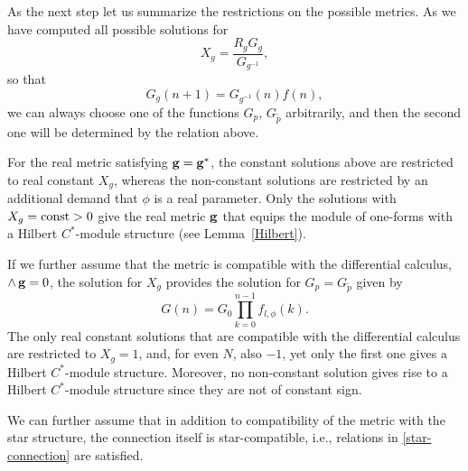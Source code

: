 \documentclass[10pt,a4paper]{amsart}
\numberwithin{equation}{section}
\newcommand{\ip}{{\tilde{p}}}
\begin{document}
As the next step let us summarize the restrictions on the possible metrics. As we have computed all possible solutions for
\[ X_g = \frac{R_g G_g}{G_{g^{-1}}},\]
so that
\[ G_g(n+1) = G_{g^{-1}}(n) f(n),\]
we can always choose one of the functions $G_p$, $G_{\ip}$ arbitrarily, and then the second one will be determined by the relation above.

\begin{Remark}\label{remark_Hilbert}For the real metric satisfying ${\bf g}={\bf g}^\ast$, the constant solutions above are restricted to real constant $X_g$, whereas the non-constant solutions are restricted by an additional demand that $\phi$ is a real parameter. Only the solutions with $X_g={\rm const} > 0$ give the real metric ${\bf g}$ that equips the module of one-forms with a Hilbert $C^\ast$-module structure (see Lemma~\ref{Hilbert}).
\end{Remark}

\begin{Remark}If we further assume that the metric is compatible with the differential calculus, $\wedge\,{\bf g}=0$, the solution for $X_g$ provides the solution for $G_p=G_\ip$ given by
\[ G(n) = G_0 \prod_{k=0}^{n-1} f_{l,\phi}(k). \]
The only real constant solutions that are compatible with the differential calculus are restricted to $X_g=1$, and, for even $N$, also $-1$, yet only the first one gives a Hilbert $C^\ast$-module structure. Moreover, no non-constant solution gives rise to a Hilbert $C^\ast$-module structure since they are not of constant sign.
\end{Remark}

We can further assume that in addition to compatibility of the metric with the star structure, the connection itself is star-compatible, i.e., relations in \eqref{star-connection} are satisfied.
\end{document}

